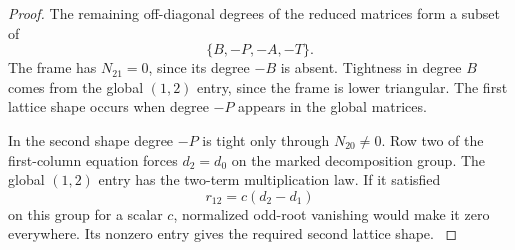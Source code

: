 \begin{proof}
The remaining off-diagonal degrees of the reduced matrices form a subset of
\[
 \{B,-P,-A,-T\}.
\] The frame has \(N_{21}=0\), since
its degree \(-B\) is absent. Tightness in degree \(B\)
comes from the global \((1,2)\) entry, since the frame
is lower triangular. The first lattice shape occurs
when degree \(-P\) appears in the global matrices.

In the second shape degree \(-P\) is tight only
through \(N_{20}\ne0\). Row two of the first-column
equation forces \(d_2=d_0\) on the marked decomposition
group. The global \((1,2)\) entry has the two-term
multiplication law. If it satisfied
\[
                      r_{12}=c(d_2-d_1)
\]
on this group for a scalar \(c\), normalized odd-root
vanishing would make it zero everywhere. Its nonzero
entry gives the required second lattice shape. \label{cor:cohomology-count-two-normalization-2}
\end{proof}
